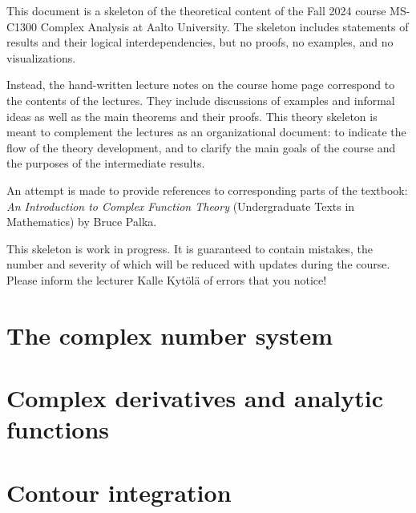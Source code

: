 %

This document is a skeleton of the theoretical content of
the Fall 2024 course MS-C1300 Complex Analysis at Aalto University.
The skeleton includes statements of results and their
logical interdependencies, but no proofs, no examples, and no
visualizations.

Instead, the hand-written lecture notes on the course home page correspond
to the contents of the lectures. They include discussions of examples and
informal ideas as well as the main theorems and their proofs.
This theory skeleton is meant to complement the lectures as
an organizational document: to indicate the flow of the theory
development, and to clarify the main goals of the course and the
purposes of the intermediate results.

An attempt is made to provide references to corresponding parts of
the textbook: \emph{An Introduction to Complex Function Theory}
(Undergraduate Texts in Mathematics) by Bruce Palka.

This skeleton is work in progress. It is guaranteed to contain mistakes,
the number and severity of which will be reduced with updates
during the course. Please inform the lecturer Kalle Kytölä of
errors that you notice!

\chapter{The complex number system}



\chapter{Complex derivatives and analytic functions}


\chapter{Contour integration}


